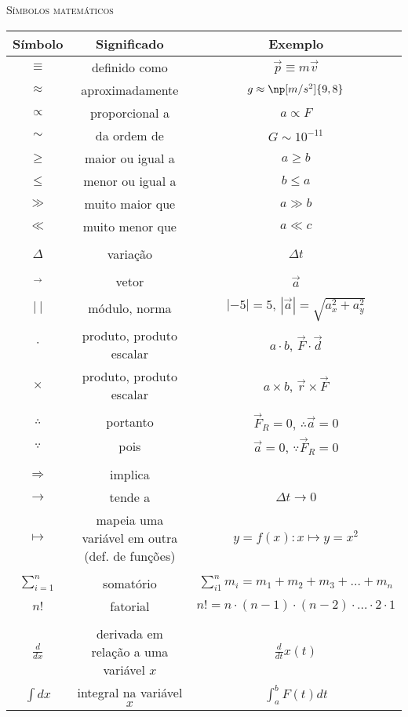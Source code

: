 \thispagestyle{plain}
\begin{fullwidth}
\begin{center}
{\noindent\LARGE\textsc{Símbolos matemáticos}} \\
\end{center}
\end{fullwidth}

\begin{table*}[!ht]
\centering
\begin{tabular}{ccc}
\toprule
Símbolo & Significado & Exemplo\\
\midrule
$\equiv$ & definido como & $\vec{p} \equiv m \vec{v}$ \\
$\approx$ & aproximadamente & $g \approx \np[m/s^2]{9,8}$\\
$\propto$ & proporcional a & $a \propto F$ \\
$\sim$ & da ordem de & $G \sim 10^{-11}$ \\
$\geqslant$ & maior ou igual a & $a \geqslant b$ \\
$\leqslant$ & menor ou igual a & $b \leqslant a$ \\
$\gg$ & muito maior que & $a \gg b$ \\
$\ll$ & muito menor que & $a \ll c$ \\
\\
$\Delta$ & variação & $\Delta t$ \\
\\
$\vec{~}$ & vetor & $\vec{a}$ \\
$|~|$ & módulo, norma & $|-5| = 5$, $|\vec{a}| = \sqrt{a_x^2 + a_y^2}$
\\
$\cdot$ & produto, produto escalar & $a \cdot b$, $\vec{F}\cdot\vec{d}$ \\
$\times$ & produto, produto escalar & $a \times b$, $\vec{r}\times\vec{F}$ \\
\\
$\therefore$ & portanto & $\vec{F}_R = 0$, $\therefore \vec{a} = 0$\\
$\because$ & pois & $\vec{a} = 0$, $\because \vec{F}_R = 0$\\
\\
$\Rightarrow$ & implica & \\
$\to$ & tende a & $\Delta t \to 0$ \\
$\mapsto$ & mapeia uma variável em outra (def. de funções) & $y=f(x): x\mapsto y=x^2$ \\
\\
$\sum_{i=1}^n$ & somatório & $\sum_{i1}^{n} m_i = m_1 + m_2 + m_3 + \dots + m_n$ \\
$n!$ & fatorial & $n! = n \cdot (n-1) \cdot (n-2) \cdot \dots \cdot 2 \cdot 1$ \\
\\
$\frac{d}{dx}$ & derivada em relação a uma variável $x$ & $\frac{d}{dt} x(t)$ \\
$\int dx$ & integral na variável $x$ & $\int_a^b F(t)dt$ \\
\bottomrule
\end{tabular}
\end{table*}

\hfill
\pagebreak
